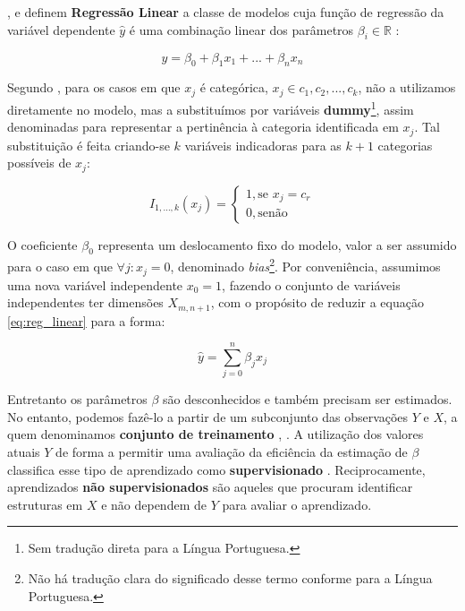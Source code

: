 \cite[p.44]{Hastie},\cite[p.138]{Bishop} e \cite[p.127]{Murphy} definem \textbf{Regressão Linear} a classe de modelos cuja função de regressão da variável dependente $ \hat{y} $ é uma combinação linear dos parâmetros $ \beta_i \in \mathbb{R} $ :

\begin{equation}\label{eq:reg_linear}
\hat{y} = \beta_0 + \beta_1x_1 + ... + \beta_nx_n
\end{equation}

Segundo \cite[9-11]{Andersen}, para os casos em que $ x_j $ é categórica, $ x_j \in {c_1,c_2,...,c_k} $, não a utilizamos diretamente no modelo, mas a substituímos por variáveis \textbf{dummy}\footnote{Sem tradução direta para a Língua Portuguesa.}, assim denominadas para representar a pertinência à categoria identificada em  $ x_j $. Tal substituição é feita criando-se $ k $ variáveis indicadoras para as $ k+1 $ categorias possíveis de $ x_j $:

\begin{equation}
I_{1,...,k}(x_j)=
	\begin{cases}
		1, \text{se }x_j = c_r \\
		0, \text{senão}
	\end{cases}
\end{equation}



O coeficiente $ \beta_0 $ representa um deslocamento fixo do modelo, valor a ser assumido para o caso em que $ \forall j: x_j = 0 $, denominado  \textit{bias}\footnote{Não há tradução clara do significado desse termo conforme \cite[p.138]{Bishop} para a Língua Portuguesa.}. Por conveniência, assumimos uma nova variável independente $ x_0=1 $, fazendo o conjunto de variáveis independentes ter dimensões $ X_{m,n+1} $, com o propósito de reduzir a equação \ref{eq:reg_linear} para a forma:

\begin{equation}\label{eq:reg_linear_bishop}
\hat{y} = \sum_{j=0}^{n}\beta_j x_j
\end{equation}

Entretanto os parâmetros $ \beta $ são desconhecidos e também precisam ser estimados. No entanto, podemos fazê-lo a partir de um subconjunto das observações $ Y $ e $ X $, a quem denominamos \textbf{conjunto de treinamento} \cite[p.4]{Bishop}, \cite[p.1]{Hastie}. A utilização dos valores atuais $ Y $ de forma a permitir uma avaliação da eficiência da estimação de $ \beta $ classifica esse tipo de aprendizado como \textbf{supervisionado} \cite[p.2]{Hastie}. Reciprocamente, aprendizados \textbf{não supervisionados} são aqueles que procuram identificar estruturas em $ X $ e não dependem de $ Y $ para avaliar o aprendizado.



